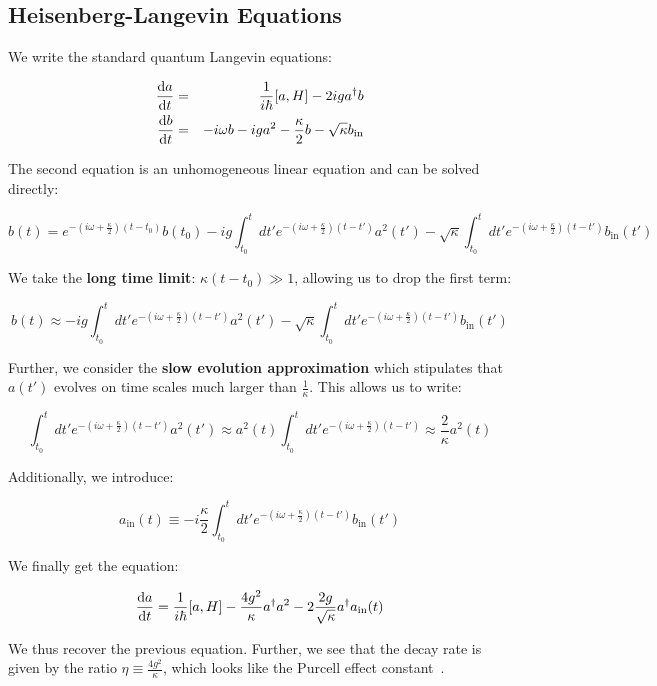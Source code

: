 \subsection{Heisenberg-Langevin Equations}

We write the standard quantum Langevin equations:

\begin{eqnarray}
    \timeDeriv{a} &=& \ihbar \commutator{a}{H} - 2 i g a^\dagger b\\
    \timeDeriv{b} &=& -i \omega b - i g a^2 -\frac{\kappa}{2} b -\sqrt{\kappa} b_{\text{in}}
\end{eqnarray}

The second equation is an unhomogeneous linear equation and can be solved directly:

\begin{equation}
    b(t) = e^{-\left(i \omega + \frac{\kappa}{2}\right) (t - t_0)} b(t_0) - i g \int_{t_0}^t dt' e^{-\left(i \omega + \frac{\kappa}{2}\right) (t - t')} a^2(t') - \sqrt{\kappa} \int_{t_0}^t dt' e^{-\left(i \omega + \frac{\kappa}{2}\right) (t - t')} b_{\text{in}}(t')
\end{equation}

We take the \textbf{long time limit}: $\kappa (t-t_0) \gg 1$, allowing us to drop the first term:

\begin{equation}
    b(t) \approx - i g \int_{t_0}^t dt' e^{-\left(i \omega + \frac{\kappa}{2}\right) (t - t')} a^2(t') - \sqrt{\kappa} \int_{t_0}^t dt' e^{-\left(i \omega + \frac{\kappa}{2}\right) (t - t')} b_{\text{in}}(t')
\end{equation}

Further, we consider the \textbf{slow evolution approximation} which stipulates that $a(t')$ evolves on time scales much larger than $\frac{1}{\kappa}$. This allows us to write:

\begin{equation}
    \int_{t_0}^t dt' e^{-\left(i \omega + \frac{\kappa}{2}\right) (t - t')} a^2(t') \approx a^2(t) \int_{t_0}^t dt' e^{-\left(i \omega + \frac{\kappa}{2}\right) (t - t')} \approx \frac{2}{\kappa} a^2(t)
\end{equation}

Additionally, we introduce:

\begin{equation}
    a_{\text{in}}(t) \equiv -i \frac{\kappa}{2} \int_{t_0}^t dt' e^{-\left(i \omega + \frac{\kappa}{2}\right) (t - t')} b_{\text{in}}(t')
\end{equation}

We finally get the equation:

\begin{equation}
    \timeDeriv{a} = \ihbar \commutator{a}{H} - \frac{4 g^2}{\kappa} a^\dagger a^2 - 2 \frac{2 g}{\sqrt{\kappa}} a^\dagger a_{\text{in}}(t)
\end{equation}

We thus recover the previous equation. Further, we see that the decay rate is given by the ratio $\eta \equiv \frac{4 g^2}{\kappa}$, which looks like the Purcell effect constant~\cite{purcell1946optical}.